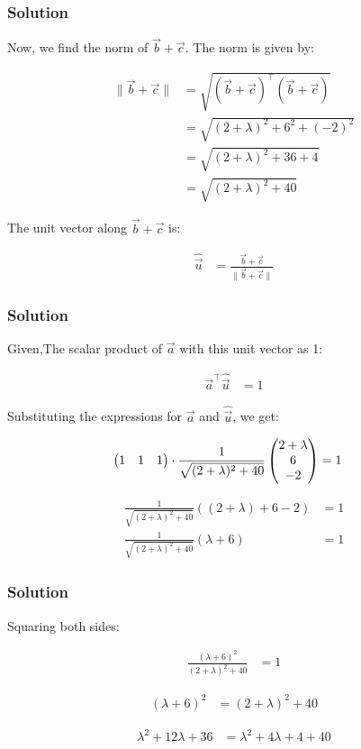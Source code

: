\documentclass{beamer}
\begin{document}
\begin{frame}
\frametitle{Solution}
Now, we find the norm of $\vec{b} + \vec{c}$. The norm is given by:

\begin{align}
\|\vec{b} + \vec{c}\| &= \sqrt{(\vec{b} + \vec{c})^\top (\vec{b} + \vec{c})} \\
&= \sqrt{(2 + \lambda)^2 + 6^2 + (-2)^2} \\
&= \sqrt{(2 + \lambda)^2 + 36 + 4} \\
&= \sqrt{(2 + \lambda)^2 + 40}
\end{align}

The unit vector along $\vec{b} + \vec{c}$ is:

\begin{align}
\hat{\vec{u}} &= \frac{\vec{b} + \vec{c}}{\|\vec{b} + \vec{c}\|}
\end{align}

\end{frame}

\begin{frame}
\frametitle{Solution}
Given,The scalar product of $\vec{a}$ with this unit vector as 1:

\begin{align}
\vec{a}^\top \hat{\vec{u}} &= 1
\end{align}

Substituting the expressions for $\vec{a}$ and $\hat{\vec{u}}$, we get:

\begin{align}
\begin{pmatrix} 1 & 1 & 1 \end{pmatrix} \cdot \frac{1}{\sqrt{(2 + \lambda)^2 + 40}} \begin{pmatrix}2 + \lambda \\ 6 \\ -2\end{pmatrix} &= 1
\end{align}



\begin{align}
\frac{1}{\sqrt{(2 + \lambda)^2 + 40}} \left( (2 + \lambda) + 6 - 2 \right) &= 1 \\
\frac{1}{\sqrt{(2 + \lambda)^2 + 40}} ( \lambda + 6) &= 1
\end{align}

\end{frame}

\begin{frame}
\frametitle{Solution}
Squaring both sides:

\begin{align}
\frac{(\lambda + 6)^2}{(2 + \lambda)^2 + 40} &= 1
\end{align}



\begin{align}
(\lambda + 6)^2 &= (2 + \lambda)^2 + 40
\end{align}


\begin{align}
\lambda^2 + 12\lambda + 36 &= \lambda^2 + 4\lambda + 4 + 40
\end{align}
\end{frame}
\end{document}
